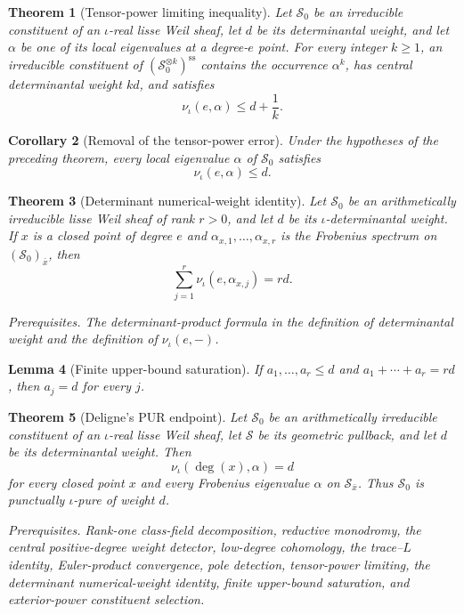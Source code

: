 \documentclass[10pt]{article}
\newtheorem{theorem}{Theorem}[section]
\newtheorem{lemma}[theorem]{Lemma}
\newtheorem{corollary}[theorem]{Corollary}
\theoremstyle{definition}
\newcommand{\deps}[1]{\par\smallskip\noindent\textit{Prerequisites.} #1}
\begin{document}
\begin{theorem}[Tensor-power limiting inequality]
Let \(\mathcal S_0\) be an irreducible constituent of an \(\iota\)-real
lisse Weil sheaf, let \(d\) be its determinantal weight, and let \(\alpha\)
be one of its local eigenvalues at a degree-\(e\) point.  For every integer
\(k\ge1\), an irreducible constituent of
\((\mathcal S_0^{\otimes k})^{\mathrm{ss}}\) contains the occurrence
\(\alpha^k\), has
central determinantal weight \(kd\), and satisfies
\[
                         \nu_\iota(e,\alpha)\le d+\frac1k.
\]
\end{theorem}

\begin{corollary}[Removal of the tensor-power error]
Under the hypotheses of the preceding theorem, every local eigenvalue
\(\alpha\) of \(\mathcal S_0\) satisfies
\[
                         \nu_\iota(e,\alpha)\le d.
\]
\end{corollary}

\begin{theorem}[Determinant numerical-weight identity]
Let \(\mathcal S_0\) be an arithmetically irreducible lisse Weil sheaf of
rank \(r>0\), and let \(d\) be its \(\iota\)-determinantal weight.  If
\(x\) is a closed point of degree \(e\) and
\(\alpha_{x,1},\ldots,\alpha_{x,r}\) is the Frobenius spectrum on
\((\mathcal S_0)_{\bar x}\), then
\[
             \sum_{j=1}^r\nu_\iota(e,\alpha_{x,j})=rd.
\]
\deps{The determinant-product formula in the definition of determinantal
weight and the definition of \(\nu_\iota(e,-)\).}
\end{theorem}

\begin{lemma}[Finite upper-bound saturation]
If \(a_1,\ldots,a_r\le d\) and
\(a_1+\cdots+a_r=rd\), then \(a_j=d\) for every \(j\).
\end{lemma}

\begin{theorem}[Deligne's PUR endpoint]
Let \(\mathcal S_0\) be an arithmetically irreducible constituent of an
\(\iota\)-real lisse Weil sheaf, let \(\mathcal S\) be its geometric
pullback, and let \(d\) be its determinantal weight.  Then
\[
 \nu_\iota(\deg(x),\alpha)=d
\]
for every closed point \(x\) and every Frobenius eigenvalue \(\alpha\) on
\(\mathcal S_{\bar x}\).  Thus \(\mathcal S_0\) is punctually
\(\iota\)-pure of weight \(d\).
\deps{Rank-one class-field decomposition, reductive monodromy, the central
positive-degree weight detector, low-degree cohomology, the trace--\(L\)
identity, Euler-product convergence, pole detection, tensor-power limiting,
the determinant numerical-weight identity, finite upper-bound saturation,
and exterior-power constituent selection.}
\end{theorem}
\end{document}

